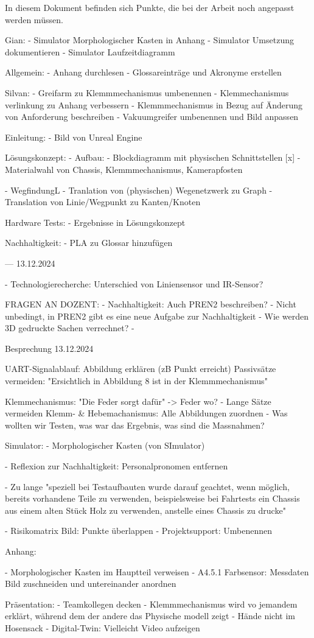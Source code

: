 
In diesem Dokument befinden sich Punkte, die bei der Arbeit noch angepasst werden müssen.





Gian:
- Simulator Morphologischer Kasten in Anhang
- Simulator Umsetzung dokumentieren
- Simulator Laufzeitdiagramm

Allgemein:
- Anhang durchlesen
- Glossareinträge und Akronyme erstellen

Silvan:
- Greifarm zu Klemmmechanismus umbenennen
- Klemmechanismus verlinkung zu Anhang verbessern
- Klemmmechanismus in Bezug auf Änderung von Anforderung beschreiben
- Vakuumgreifer umbenennen und Bild anpassen

Einleitung:
- Bild von Unreal Engine

Lösungskonzept:
- Aufbau:
  - Blockdiagramm mit physischen Schnittstellen [x]
  - Materialwahl von Chassis, Klemmmechanismus, Kamerapfosten

- WegfindungL
  - Tranlation von (physischen) Wegenetzwerk zu Graph
  - Translation von Linie/Wegpunkt zu Kanten/Knoten

Hardware Tests:
- Ergebnisse in Lösungskonzept

Nachhaltigkeit:
- PLA zu Glossar hinzufügen


--- 13.12.2024

- Technologierecherche: Unterschied von Liniensensor und IR-Sensor?




FRAGEN AN DOZENT:
- Nachhaltigkeit: Auch PREN2 beschreiben?
  - Nicht unbedingt, in PREN2 gibt es eine neue Aufgabe zur Nachhaltigkeit
- Wie werden 3D gedruckte Sachen verrechnet?
  - 


Besprechung 13.12.2024

UART-Signalablauf: Abbildung erklären (zB Punkt erreicht)
Passivsätze vermeiden: "Ersichtlich in Abbildung 8 ist in der Klemmmechanismus"

Klemmechanismus: "Die Feder  sorgt dafür" -> Feder wo?
- Lange Sätze vermeiden
Klemm- \& Hebemachanismus: Alle Abbildungen zuordnen
- Was wollten wir Testen, was  war das Ergebnis, was sind die Massnahmen?

Simulator:
- Morphologischer Kasten (von SImulator)



- Reflexion zur Nachhaltigkeit: Personalpronomen entfernen

- Zu lange "speziell bei Testaufbauten wurde darauf geachtet, wenn möglich, bereits
vorhandene Teile zu verwenden, beispielsweise bei Fahrtests ein Chassis aus einem alten Stück Holz zu verwenden, anstelle eines Chassis zu drucke"

- Risikomatrix Bild: Punkte überlappen
- Projektsupport: Umbenennen

Anhang:

- Morphologischer Kasten im Hauptteil verweisen
- A4.5.1 Farbsensor: Messdaten Bild zuschneiden und untereinander anordnen


Präsentation:
- Teamkollegen decken
- Klemmmechanismus wird vo jemandem erklärt, während dem der andere das Physische modell zeigt
- Hände nicht im Hosensack
- Digital-Twin: Vielleicht Video aufzeigen

